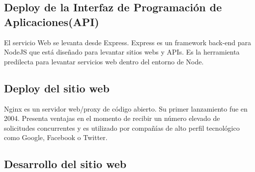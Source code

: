 \subsection{Deploy de la Interfaz de Programación de Aplicaciones(API)}

El servicio Web se levanta desde Express. Express es un framework back-end para NodeJS que está diseñado para levantar sitios webs y APIs. Es la herramienta predilecta para levantar servicios web dentro del entorno de Node.

\subsection{Deploy del sitio web}

Nginx es un servidor web/proxy de código abierto. Su primer lanzamiento fue en 2004. Presenta ventajas en el momento de recibir un número elevado de solicitudes concurrentes y es utilizado por compañías de alto perfil tecnológico como Google, Facebook o Twitter.

\subsection{Desarrollo del sitio web}

